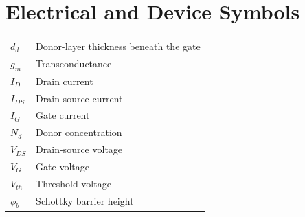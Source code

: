 \section*{Electrical and Device Symbols}
\begin{tabularx}{\linewidth}{@{}lY@{}}
  $d_d$ & Donor-layer thickness beneath the gate \\
  $g_m$ & Transconductance \\
  $I_D$ & Drain current \\
  $I_{DS}$ & Drain-source current \\
  $I_G$ & Gate current \\
  $N_d$ & Donor concentration \\
  $V_{DS}$ & Drain-source voltage \\
  $V_G$ & Gate voltage \\
  $V_{th}$ & Threshold voltage \\
  $\phi_b$ & Schottky barrier height \\
\end{tabularx}
